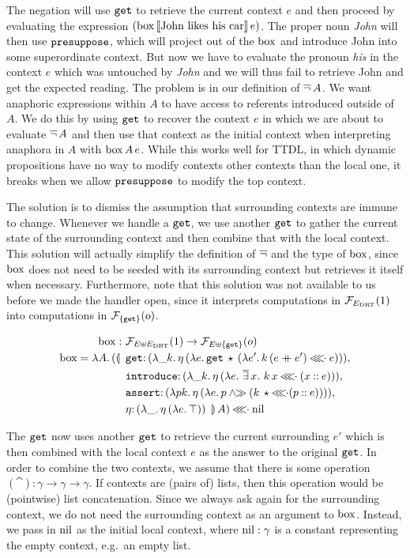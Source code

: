 The negation will use $\mathtt{get}$ to retrieve the current context $e$ and
then proceed by evaluating the expression
$(\mathrm{box}\,\llbracket \text{John likes his car} \rrbracket\,e)$. The proper noun
\emph{John} will then use $\mathtt{presuppose}$, which will project out of the
$\mathrm{box}$ and introduce John into some superordinate context. But now we have
to evaluate the pronoun \emph{his} in the context $e$ which was untouched
by \emph{John} and we will thus fail to retrieve John and get the expected
reading. The problem is in our definition of $\mathop{\overline{\lnot}} A$. We want anaphoric
expressions within $A$ to have access to referents introduced outside of
$A$. We do this by using $\mathtt{get}$ to recover the context $e$ in which we
are about to evaluate $\mathop{\overline{\lnot}} A$ and then use that context as the initial
context when interpreting anaphora in $A$ with $\mathrm{box}\,A\,e$. While
this works well for TTDL, in which dynamic propositions have no way to
modify contexts other contexts than the local one, it breaks when we allow
$\mathtt{presuppose}$ to modify the top context.

The solution is to dismiss the assumption that surrounding contexts are
immune to change. Whenever we handle a $\mathtt{get}$, we use another
$\mathtt{get}$ to gather the current state of the surrounding context and then
combine that with the local context. This solution will actually simplify
the definition of $\mathop{\overline{\lnot}}$ and the type of $\mathrm{box}$, since $\mathrm{box}$ does not
need to be seeded with its surrounding context but retrieves it itself when
necessary. Furthermore, note that this solution was not available to us
before we made the handler open, since it interprets computations in
$\mathcal{F}_{E_{\mathrm{DRT}}}(1)$ into computations in $\mathcal{F}_{\{\mathtt{get}\}}(o)$.

\begin{align*}
  \BOX :\ &\FF_{E \uplus E_\DRT}(1) \to \FF_{E \uplus \{\op{get}\}}(o) \\
  \BOX = \lam{A}{(\ap{\banana{\ 
  &\onto{\op{get}}{(\lam{\_ k}{\etaE{(\lam{e}{\app{\op{get}}{\star}{(\lam{e'}{\ap{k}{(e \cat e')} \apll e})}})}})}, \\
  &\onto{\op{introduce}}{(\lam{\_ k}{\etaE{(\lam{e}{\dexists x.\ \ap{k}{x} \apll (x \cons e)})}})}, \\
  &\onto{\op{assert}}{(\lam{p k}{\etaE{(\lam{e}{p \andr (\ap{k}{\star} \apll (p \cons e))})}})}, \\
  &\onto{\eta}{(\lam{\_}{\etaE{(\lam{e}{\top})}})}\ }}{A}) \apll \nil}
\end{align*}

The $\mathtt{get}$ now uses another $\mathtt{get}$ to retrieve the current
surrounding $e'$ which is then combined with the local context $e$ as the
answer to the original $\mathtt{get}$. In order to combine the two contexts, we
assume that there is some operation
$(\cat) : \gamma \to \gamma \to \gamma$. If contexts are (pairs of) lists,
then this operation would be (pointwise) list concatenation. Since we
always ask again for the surrounding context, we do not need the
surrounding context as an argument to $\mathrm{box}$. Instead, we pass in $\mathrm{nil}$ as
the initial local context, where $\mathrm{nil} : \gamma$ is a constant representing
the empty context, e.g.\ an empty list.

